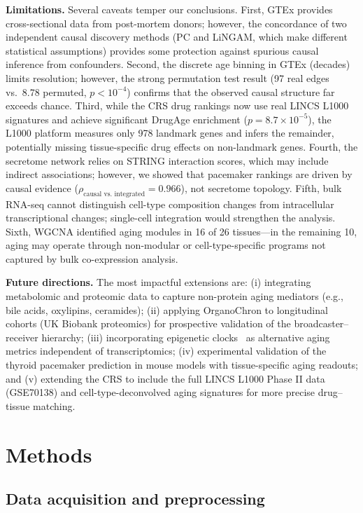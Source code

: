 \documentclass[11pt,a4paper]{article}
\begin{document}
\textbf{Limitations.} Several caveats temper our conclusions. First, GTEx provides cross-sectional data from post-mortem donors; however, the concordance of two independent causal discovery methods (PC and LiNGAM, which make different statistical assumptions) provides some protection against spurious causal inference from confounders. Second, the discrete age binning in GTEx (decades) limits resolution; however, the strong permutation test result (97 real edges vs.\ 8.78 permuted, $p < 10^{-4}$) confirms that the observed causal structure far exceeds chance. Third, while the CRS drug rankings now use real LINCS L1000 signatures and achieve significant DrugAge enrichment ($p = 8.7 \times 10^{-5}$), the L1000 platform measures only 978 landmark genes and infers the remainder, potentially missing tissue-specific drug effects on non-landmark genes. Fourth, the secretome network relies on STRING interaction scores, which may include indirect associations; however, we showed that pacemaker rankings are driven by causal evidence ($\rho_{\text{causal vs.\ integrated}} = 0.966$), not secretome topology. Fifth, bulk RNA-seq cannot distinguish cell-type composition changes from intracellular transcriptional changes; single-cell integration would strengthen the analysis. Sixth, WGCNA identified aging modules in 16 of 26 tissues---in the remaining 10, aging may operate through non-modular or cell-type-specific programs not captured by bulk co-expression analysis.

\textbf{Future directions.} The most impactful extensions are: (i) integrating metabolomic and proteomic data to capture non-protein aging mediators (e.g., bile acids, oxylipins, ceramides); (ii) applying OrganoChron to longitudinal cohorts (UK Biobank proteomics) for prospective validation of the broadcaster--receiver hierarchy; (iii) incorporating epigenetic clocks~\cite{ref35} as alternative aging metrics independent of transcriptomics; (iv) experimental validation of the thyroid pacemaker prediction in mouse models with tissue-specific aging readouts; and (v) extending the CRS to include the full LINCS L1000 Phase II data (GSE70138) and cell-type-deconvolved aging signatures for more precise drug--tissue matching.

\section*{Methods}

\subsection*{Data acquisition and preprocessing}
\end{document}
